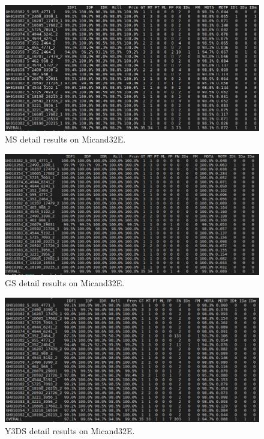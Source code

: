 \begin{figure}
	\centerline{\includegraphics[width=1\linewidth]{Figs/Evaluation/micand26/ms.png}}
	\caption{MS detail results on Micand32E.}
\end{figure}
\begin{figure}
	\centerline{\includegraphics[width=1\linewidth]{Figs/Evaluation/micand26/gs.png}}
	\caption{GS detail results on Micand32E.}
\end{figure}
\begin{figure}
	\centerline{\includegraphics[width=1\linewidth]{Figs/Evaluation/micand26/y3ds.png}}
	\caption{Y3DS detail results on Micand32E.}
\end{figure}

